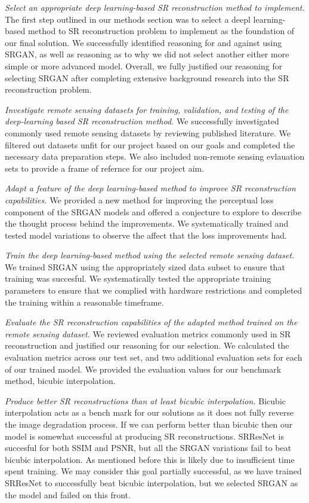 \textit{Select an appropriate deep learning-based SR reconstruction method to implement.} The first step outlined in our methods section was to select a deepl learning-based method to SR reconstruction problem to implement as the foundation of our final solution. We successfully identified reasoning for and against using SRGAN, as well as reasoning as to why we did not select another either more simple or more advanced model. Overall, we fully justified our reasoning for selecting SRGAN after completing extensive background research into the SR reconstruction problem.

\textit{Investigate remote sensing datasets for training, validation, and testing of the deep-learning based SR reconstruction method.} We successfully investigated commonly used remote sensing datasets by reviewing published literature. We filtered out datasets unfit for our project based on our goals and completed the necessary data preparation steps. We also included non-remote sensing evlauation sets to provide a frame of refernce for our project aim. 

\textit{Adapt a feature of the deep learning-based method to improve SR reconstruction capabilities.} We provided a new method for improving the perceptual loss component of the SRGAN models and offered a conjecture to explore to describe the thought process behind the improvements. We systematically trained and tested model variations to observe the affect that the loss improvements had.

\textit{Train the deep learning-based method using the selected remote sensing dataset.} We trained SRGAN using the appropriately sized data subset to ensure that training was succesful. We systematically tested the appropriate training parameters to ensure that we complied with hardware restrictions and completed the training within a reasonable timeframe.

\textit{Evaluate the SR reconstruction capabilities of the adapted method trained on the remote sensing dataset.} We reviewed evaluation metrics commonly used in SR reconstruction and justified our reasoning for our selection. We calculated the evaluation metrics across our test set, and two additional evaluation sets for each of our trained model. We provided the evaluation values for our benchmark method, bicubic interpolation.

\textit{Produce better SR reconstructions than at least bicubic interpolation.} Bicubic interpolation acts as a bench mark for our solutions as it does not fully reverse the image degradation process. If we can perform better than bicubic then our model is somewhat successful at producing SR reconstructions. SRResNet is succesful for both SSIM and PSNR, but all the SRGAN variations fail to beat bicubic interpolation. As mentioned before this is likely due to insufficient time spent training. We may consider this goal partially successful, as we have trained SRResNet to successfully beat bicubic interpolation, but we selected SRGAN as the model and failed on this front.

